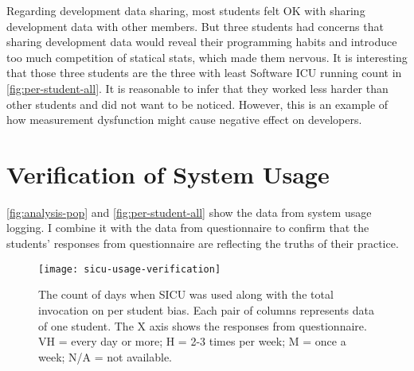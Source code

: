 Regarding development data sharing, most students felt OK with sharing development data with other members. But three students had concerns that sharing development data would reveal their programming habits and introduce too much competition of statical stats, which made them nervous. It is interesting that those three students are the three with least Software ICU running count in \autoref{fig:per-student-all}. It is reasonable to infer that they worked less harder than other students and did not want to be noticed. However, this is an example of how measurement dysfunction might cause negative effect on developers.

\section {Verification of System Usage}

\autoref{fig:analysis-pop} and \autoref{fig:per-student-all} show the data from system usage logging. I combine it with the data from questionnaire to confirm that the students' responses from questionnaire are reflecting the truths of their practice. 

\begin{figure}[htbp] %
   \centering
   \texttt{[image: sicu-usage-verification]} 
   \caption[SICU usage on per student bias]{The count of days when SICU was used along with the total invocation on per student bias. Each pair of columns represents data of one student. The X axis shows the responses from questionnaire. VH = every day or more; H = 2-3 times per week; M = once a week; N/A = not available.}
   \label{fig:sicu-usage-verification}
\end{figure}

